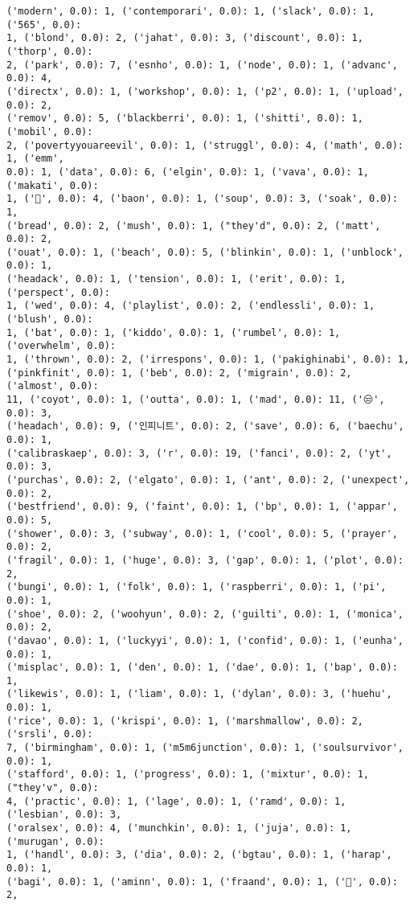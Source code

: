 \documentclass[11pt]{article}
\begin{document}
\begin{Verbatim}[commandchars=\\\{\}]
('modern', 0.0): 1, ('contemporari', 0.0): 1, ('slack', 0.0): 1, ('565', 0.0):
1, ('blond', 0.0): 2, ('jahat', 0.0): 3, ('discount', 0.0): 1, ('thorp', 0.0):
2, ('park', 0.0): 7, ('esnho', 0.0): 1, ('node', 0.0): 1, ('advanc', 0.0): 4,
('directx', 0.0): 1, ('workshop', 0.0): 1, ('p2', 0.0): 1, ('upload', 0.0): 2,
('remov', 0.0): 5, ('blackberri', 0.0): 1, ('shitti', 0.0): 1, ('mobil', 0.0):
2, ('povertyyouareevil', 0.0): 1, ('struggl', 0.0): 4, ('math', 0.0): 1, ('emm',
0.0): 1, ('data', 0.0): 6, ('elgin', 0.0): 1, ('vava', 0.0): 1, ('makati', 0.0):
1, ('💛', 0.0): 4, ('baon', 0.0): 1, ('soup', 0.0): 3, ('soak', 0.0): 1,
('bread', 0.0): 2, ('mush', 0.0): 1, ("they'd", 0.0): 2, ('matt', 0.0): 2,
('ouat', 0.0): 1, ('beach', 0.0): 5, ('blinkin', 0.0): 1, ('unblock', 0.0): 1,
('headack', 0.0): 1, ('tension', 0.0): 1, ('erit', 0.0): 1, ('perspect', 0.0):
1, ('wed', 0.0): 4, ('playlist', 0.0): 2, ('endlessli', 0.0): 1, ('blush', 0.0):
1, ('bat', 0.0): 1, ('kiddo', 0.0): 1, ('rumbel', 0.0): 1, ('overwhelm', 0.0):
1, ('thrown', 0.0): 2, ('irrespons', 0.0): 1, ('pakighinabi', 0.0): 1,
('pinkfinit', 0.0): 1, ('beb', 0.0): 2, ('migrain', 0.0): 2, ('almost', 0.0):
11, ('coyot', 0.0): 1, ('outta', 0.0): 1, ('mad', 0.0): 11, ('😒', 0.0): 3,
('headach', 0.0): 9, ('인피니트', 0.0): 2, ('save', 0.0): 6, ('baechu', 0.0): 1,
('calibraskaep', 0.0): 3, ('r', 0.0): 19, ('fanci', 0.0): 2, ('yt', 0.0): 3,
('purchas', 0.0): 2, ('elgato', 0.0): 1, ('ant', 0.0): 2, ('unexpect', 0.0): 2,
('bestfriend', 0.0): 9, ('faint', 0.0): 1, ('bp', 0.0): 1, ('appar', 0.0): 5,
('shower', 0.0): 3, ('subway', 0.0): 1, ('cool', 0.0): 5, ('prayer', 0.0): 2,
('fragil', 0.0): 1, ('huge', 0.0): 3, ('gap', 0.0): 1, ('plot', 0.0): 2,
('bungi', 0.0): 1, ('folk', 0.0): 1, ('raspberri', 0.0): 1, ('pi', 0.0): 1,
('shoe', 0.0): 2, ('woohyun', 0.0): 2, ('guilti', 0.0): 1, ('monica', 0.0): 2,
('davao', 0.0): 1, ('luckyyi', 0.0): 1, ('confid', 0.0): 1, ('eunha', 0.0): 1,
('misplac', 0.0): 1, ('den', 0.0): 1, ('dae', 0.0): 1, ('bap', 0.0): 1,
('likewis', 0.0): 1, ('liam', 0.0): 1, ('dylan', 0.0): 3, ('huehu', 0.0): 1,
('rice', 0.0): 1, ('krispi', 0.0): 1, ('marshmallow', 0.0): 2, ('srsli', 0.0):
7, ('birmingham', 0.0): 1, ('m5m6junction', 0.0): 1, ('soulsurvivor', 0.0): 1,
('stafford', 0.0): 1, ('progress', 0.0): 1, ('mixtur', 0.0): 1, ("they'v", 0.0):
4, ('practic', 0.0): 1, ('lage', 0.0): 1, ('ramd', 0.0): 1, ('lesbian', 0.0): 3,
('oralsex', 0.0): 4, ('munchkin', 0.0): 1, ('juja', 0.0): 1, ('murugan', 0.0):
1, ('handl', 0.0): 3, ('dia', 0.0): 2, ('bgtau', 0.0): 1, ('harap', 0.0): 1,
('bagi', 0.0): 1, ('aminn', 0.0): 1, ('fraand', 0.0): 1, ('😬', 0.0): 2,

\end{Verbatim}
\end{document}
